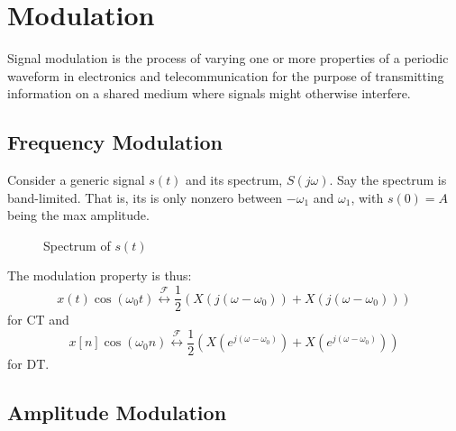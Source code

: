 \section{Modulation}
Signal modulation is the process of varying one or more properties of
a periodic waveform in electronics and telecommunication for the
purpose of transmitting information on a shared medium where signals might
otherwise interfere.
\subsection{Frequency Modulation}
Consider a generic signal $s(t)$ and its spectrum, $S(j\omega)$. Say
the spectrum is band-limited. That is, its is only nonzero between
$-\omega_1$ and $\omega_1$, with $s(0) = A$ being the max amplitude.
\begin{figure}
    \caption{Spectrum of $s(t)$}
\end{figure}

The modulation property is thus:
\begin{equation}
    x(t)\cos(\omega_0 t) \overset{\mathcal{F}}{\leftrightarrow} \frac{1}{2}\left( X(j(\omega-\omega_0)) + X(j(\omega-\omega_0))\right)
\end{equation}
for CT and
\begin{equation}
    x[n]\cos(\omega_0 n)  \overset{\mathcal{F}}{\leftrightarrow}  \frac{1}{2}\left( X(e^{j(\omega-\omega_0)}) + X(e^{j(\omega-\omega_0)})\right)
\end{equation}
for DT.

\subsection{Amplitude Modulation}